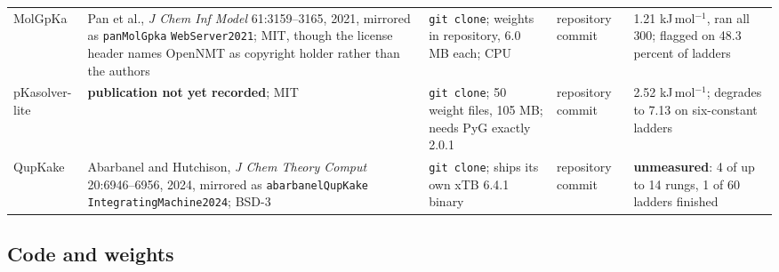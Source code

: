 \begin{table}[!htbp]
\begin{tabular}{@{}p{}p{}p{}p{}p{}@{}}
    MolGpKa & Pan et al., \emph{J Chem Inf Model} 61:3159--3165, 2021, mirrored as
      \texttt{panMolGpka} \texttt{WebServer2021}; MIT, though the license header names
      OpenNMT as copyright holder rather than the authors &
      \texttt{git clone}; weights in repository, 6.0 MB each; CPU & repository commit &
      1.21 kJ\,mol$^{-1}$, ran all 300; flagged on 48.3 percent of ladders \\
    pKasolver-lite & \textbf{publication not yet recorded}; MIT &
      \texttt{git clone}; 50 weight files, 105 MB; needs PyG exactly 2.0.1 &
      repository commit & 2.52 kJ\,mol$^{-1}$; degrades to 7.13 on six-constant ladders \\
    QupKake & Abarbanel and Hutchison, \emph{J Chem Theory Comput} 20:6946--6956, 2024,
      mirrored as \texttt{abarbanelQupKake} \texttt{IntegratingMachine2024}; BSD-3 &
      \texttt{git clone}; ships its own xTB 6.4.1 binary & repository commit &
      \textbf{unmeasured}: 4 of up to 14 rungs, 1 of 60 ladders finished \\
    \hline
  \end{tabular}
\end{table}

\subsection{Code and weights}

